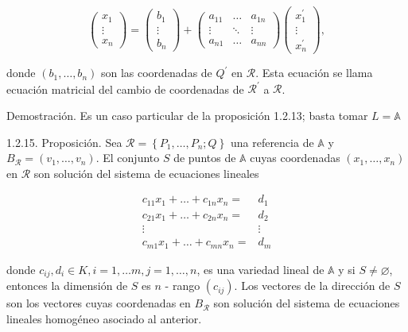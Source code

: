 \documentclass[12pt, a4paper, ones, notitlepage, openany,titlepage]{article}
\begin{document}
$$
\left(\begin{array}{c}
x_{1} \\
\vdots \\
x_{n}
\end{array}\right)=\left(\begin{array}{c}
b_{1} \\
\vdots \\
b_{n}
\end{array}\right)+\left(\begin{array}{ccc}
a_{11} & \ldots & a_{1 n} \\
\vdots & \ddots & \vdots \\
a_{n 1} & \ldots & a_{n n}
\end{array}\right)\left(\begin{array}{c}
x_{1}^{\prime} \\
\vdots \\
x_{n}^{\prime}
\end{array}\right),
$$

donde $\left(b_{1}, \ldots, b_{n}\right)$ son las coordenadas de $Q^{\prime}$ en $\mathcal{R}$. Esta ecuación se llama ecuación matricial del cambio de coordenadas de $\mathcal{R}^{\prime}$ a $\mathcal{R}$.

Demostración. Es un caso particular de la proposición 1.2.13; basta tomar $L=\mathbb{A}$

1.2.15. Proposición. Sea $\mathcal{R}=\left\{P_{1}, \ldots, P_{n} ; Q\right\}$ una referencia de $\mathbb{A}$ y $B_{\mathcal{R}}=\left(v_{1}, \ldots, v_{n}\right)$. El conjunto $S$ de puntos de $\mathbb{A}$ cuyas coordenadas $\left(x_{1}, \ldots, x_{n}\right)$ en $\mathcal{R}$ son solución del sistema de ecuaciones lineales

$$
\begin{aligned}
c_{11} x_{1}+\ldots+c_{1 n} x_{n}= & d_{1} \\
c_{21} x_{1}+\ldots+c_{2 n} x_{n}= & d_{2} \\
\vdots & \vdots \\
c_{m 1} x_{1}+\ldots+c_{m n} x_{n}= & d_{m}
\end{aligned}
$$

donde $c_{i j}, d_{i} \in K, i=1, \ldots m, j=1, \ldots, n$, es una variedad lineal de $\mathbb{A}$ y si $S \neq \varnothing$, entonces la dimensión de $S$ es $n$ - rango $\left(c_{i j}\right)$. Los vectores de la dirección de $S$ son los vectores cuyas coordenadas en $B_{\mathcal{R}}$ son solución del sistema de ecuaciones lineales homogéneo asociado al anterior.
\end{document}
